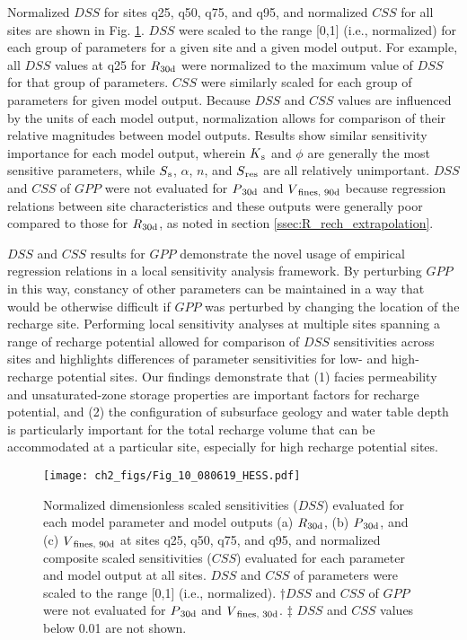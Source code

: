 Normalized $DSS$ for sites q25, q50, q75, and q95, and normalized $CSS$ for all sites are shown in Fig. \ref{fig:DSS}. $DSS$ were scaled to the range [0,1] (i.e., normalized) for each group of parameters for a given site and a given model output. For example, all $DSS$ values at q25 for $R\textsubscript{30d}$ were normalized to the maximum value of $DSS$ for that group of parameters. $CSS$ were similarly scaled for each group of parameters for given model output. Because $DSS$ and $CSS$ values are influenced by the units of each model output, normalization allows for comparison of their relative magnitudes between model outputs. Results show similar sensitivity importance for each model output, wherein $K\textsubscript{s}$ and $\phi$ are generally the most sensitive parameters, while $S\textsubscript{s}$, $\alpha$, $n$, and $S\textsubscript{res}$ are all relatively unimportant. $DSS$ and $CSS$ of $GPP$ were not evaluated for $P\textsubscript{30d}$ and $V\textsubscript{fines, 90d}$ because regression relations between site characteristics and these outputs were generally poor compared to those for $R\textsubscript{30d}$, as noted in section \ref{ssec:R_rech_extrapolation}.

$DSS$ and $CSS$ results for $GPP$ demonstrate the novel usage of empirical regression relations in a local sensitivity analysis framework. By perturbing $GPP$ in this way, constancy of other parameters can be maintained in a way that would be otherwise difficult if $GPP$ was perturbed by changing the location of the recharge site. Performing local sensitivity analyses at multiple sites spanning a range of recharge potential allowed for comparison of $DSS$ sensitivities across sites and highlights differences of parameter sensitivities for low- and high-recharge potential sites. Our findings demonstrate that (1) facies permeability and unsaturated-zone storage properties are important factors for recharge potential, and (2) the configuration of subsurface geology and water table depth is particularly important for the total recharge volume that can be accommodated at a particular site, especially for high recharge potential sites.

\begin{figure*}[t]
\centering
\texttt{[image: ch2\_figs/Fig\_10\_080619\_HESS.pdf]}
\caption{Normalized dimensionless scaled sensitivities ($DSS$) evaluated for each model parameter and model outputs (a) $R\textsubscript{30d}$, (b) $P\textsubscript{30d}$, and (c) $V\textsubscript{fines, 90d}$ at sites q25, q50, q75, and q95, and normalized composite scaled sensitivities ($CSS$) evaluated for each parameter and model output at all sites. $DSS$ and $CSS$ of parameters were scaled to the range [0,1] (i.e., normalized). $\dagger DSS$ and $CSS$ of $GPP$ were not evaluated for $P\textsubscript{30d}$ and $V\textsubscript{fines, 30d}$. $\ddagger$ $DSS$ and $CSS$ values below 0.01 are not shown.}
\label{fig:DSS}
\end{figure*}


